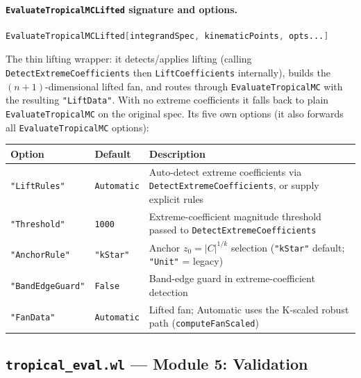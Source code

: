 \documentclass[11pt,a4paper]{article}
\begin{document}
\paragraph{\texttt{EvaluateTropicalMCLifted} signature and options.}\label{sec:lifted-api}
\begin{lstlisting}[language=Mathematica]
EvaluateTropicalMCLifted[integrandSpec, kinematicPoints, opts...]
\end{lstlisting}
The thin lifting wrapper: it detects/applies lifting (calling \texttt{DetectExtremeCoefficients} then \texttt{LiftCoefficients} internally), builds the $(n{+}1)$-dimensional lifted fan, and routes through \texttt{EvaluateTropicalMC} with the resulting \texttt{"LiftData"}. With no extreme coefficients it falls back to plain \texttt{EvaluateTropicalMC} on the original spec. Its five own options (it also forwards all \texttt{EvaluateTropicalMC} options):
\begin{center}
\begin{tabular}{lll}
\toprule
\textbf{Option} & \textbf{Default} & \textbf{Description} \\
\midrule
\texttt{"LiftRules"} & \texttt{Automatic} & Auto-detect extreme coefficients via \texttt{DetectExtremeCoefficients}, or supply explicit rules \\
\texttt{"Threshold"} & \texttt{1000} & Extreme-coefficient magnitude threshold passed to \texttt{DetectExtremeCoefficients} \\
\texttt{"AnchorRule"} & \texttt{"kStar"} & Anchor $z_0=|C|^{1/k}$ selection (\texttt{"kStar"} default; \texttt{"Unit"} = legacy) \\
\texttt{"BandEdgeGuard"} & \texttt{False} & Band-edge guard in extreme-coefficient detection \\
\texttt{"FanData"} & \texttt{Automatic} & Lifted fan; Automatic uses the K-scaled robust path (\texttt{computeFanScaled}) \\
\bottomrule
\end{tabular}
\end{center}

\subsection{\texttt{tropical\_eval.wl} --- Module 5: Validation}
\end{document}
